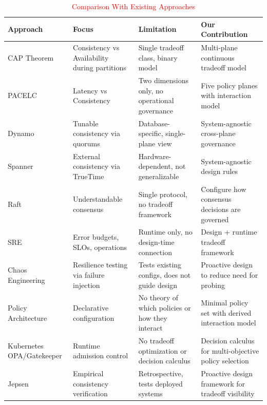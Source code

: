 \documentclass[conference]{IEEEtran}
\begin{document}
\begin{table}[t]
\caption{\textcolor{red}{Comparison With Existing Approaches}}
\label{tab:novelty}
\centering
\small
\renewcommand{\arraystretch}{1.15}

{\color{red}
\begin{tabularx}{\columnwidth}{@{}p{1.8cm}X X X@{}}
\toprule
\textbf{Approach} &
\textbf{Focus} &
\textbf{Limitation} &
\textbf{Our Contribution} \\
\midrule

CAP Theorem~\cite{brewer2000cap}
& Consistency vs Availability during partitions
& Single tradeoff class, binary model
& Multi-plane continuous tradeoff model \\

PACELC~\cite{pacelc}
& Latency vs Consistency
& Two dimensions only, no operational governance
& Five policy planes with interaction model \\

Dynamo~\cite{dynamo}
& Tunable consistency via quorums
& Database-specific, single-plane view
& System-agnostic cross-plane governance \\

Spanner~\cite{spanner}
& External consistency via TrueTime
& Hardware-dependent, not generalizable
& System-agnostic design rules \\

Raft~\cite{raft}
& Understandable consensus
& Single protocol, no tradeoff framework
& Configure how consensus decisions are governed \\

SRE~\cite{sre}
& Error budgets, SLOs, operations
& Runtime only, no design-time connection
& Design + runtime tradeoff framework \\

Chaos Engineering~\cite{chaos}
& Resilience testing via failure injection
& Tests existing configs, does not guide design
& Proactive design to reduce need for probing \\

Policy Architecture~\cite{policyarch}
& Declarative configuration
& No theory of which policies or how they interact
& Minimal policy set with derived interaction model \\

Kubernetes OPA/Gatekeeper
& Runtime admission control
& No tradeoff optimization or decision calculus
& Decision calculus for multi-objective policy selection \\

Jepsen~\cite{jepsen}
& Empirical consistency verification
& Retrospective, tests deployed systems
& Proactive design framework for tradeoff visibility \\

\bottomrule
\end{tabularx}
}
\end{table}
\end{document}
